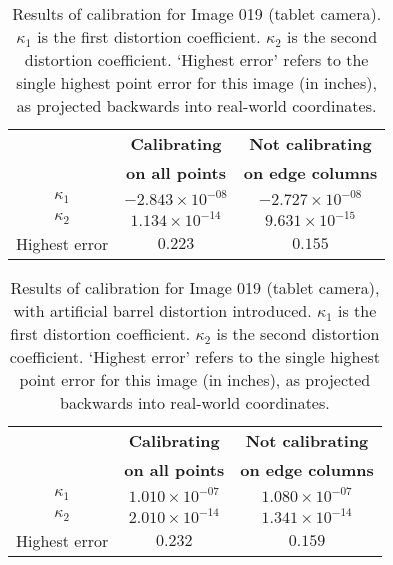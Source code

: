 \begin{table}[h!]
  \centering
  \begin{tabular}{c c c}
    \toprule
    \textbf{ } & \textbf{Calibrating} & \textbf{Not calibrating}\\
    \textbf{ } & \textbf{on all points} & \textbf{on edge columns}\\
    \midrule
    $\kappa_{1}$ & $-2.843 \times 10^{-08}$ & $-2.727 \times 10^{-08}$\\
    $\kappa_{2}$ & $1.134 \times 10^{-14}$ & $9.631 \times 10^{-15}$\\
    Highest error & $0.223$ & $0.155$\\
    \bottomrule
  \end{tabular}
  \caption[Results of calibration for Image 019 (tablet camera)]{Results of calibration for Image 019 (tablet camera). $\kappa_{1}$ is the first distortion coefficient. $\kappa_{2}$ is the second distortion coefficient. `Highest error' refers to the single highest point error for this image (in inches), as projected backwards into real-world coordinates.}
  \label{tbl:calibration-stats-090-1}
\end{table}

\begin{table}[h!]
  \centering
  \begin{tabular}{c c c}
    \toprule
    \textbf{ } & \textbf{Calibrating} & \textbf{Not calibrating}\\
    \textbf{ } & \textbf{on all points} & \textbf{on edge columns}\\
    \midrule
    $\kappa_{1}$ & $1.010 \times 10^{-07}$ & $1.080 \times 10^{-07}$\\
    $\kappa_{2}$ & $2.010 \times 10^{-14}$ & $1.341 \times 10^{-14}$\\
    Highest error & $0.232$ & $0.159$\\
    \bottomrule
  \end{tabular}
  \caption[Results of calibration for Image 019 (tablet camera) with barrel distortion]{Results of calibration for Image 019 (tablet camera), with artificial barrel distortion introduced. $\kappa_{1}$ is the first distortion coefficient. $\kappa_{2}$ is the second distortion coefficient. `Highest error' refers to the single highest point error for this image (in inches), as projected backwards into real-world coordinates.}
  \label{tbl:calibration-stats-090-2}
\end{table}

